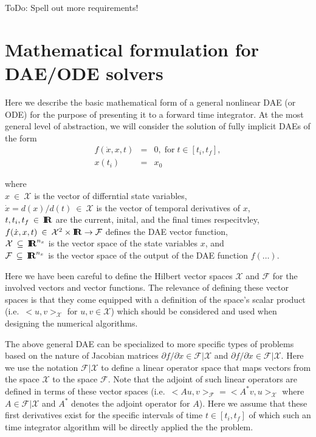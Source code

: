 \documentclass[pdf,ps2pdf,11pt]{SANDreport}
\begin{document}
ToDo: Spell out more requirements!

\section{Mathematical formulation for DAE/ODE solvers}

Here we describe the basic mathematical form of a general nonlinear DAE (or
ODE) for the purpose of presenting it to a forward time integrator.  At the
most general level of abstraction, we will consider the solution of fully
implicit DAEs of the form
%
\begin{eqnarray}
f(\dot{x},x,t) & = & 0, \; \mbox{for} \; t \in [t_i, t_f], \label{rythmos:eqn:dae} \\
x(t_i) & = & x_0 \label{rythmos:eqn:dae:ic}
\end{eqnarray}
\begin{tabbing}
\hspace{4ex}where\hspace{5ex}\= \\
\>	$x\:\in\:\mathcal{X}$ is the vector of differntial state variables, \\
\>	$\dot{x} = d(x)/d(t)\:\in\:\mathcal{X}$ is the vector of temporal derivatives of $x$, \\
\>	$t, t_i, t_f\:\in\:\mbox{\textbf{I}}\hspace{-0.6ex}\mbox{\textbf{R}}$ are the current, inital, and the final times respecitvley, \\
\>	$f(\dot{x},x,t)\:\in\:\mathcal{X}^2\times\mbox{\textbf{I}}\hspace{-0.6ex}\mbox{\textbf{R}}\rightarrow\mathcal{F}$ defines the DAE vector function, \\
\>	$\mathcal{X} \:\subseteq\:\mbox{\textbf{I}}\hspace{-0.6ex}\mbox{\textbf{R}}^{n_x}$ is the vector space of the state variables $x$, and \\
\>	$\mathcal{F} \:\subseteq\:\mbox{\textbf{I}}\hspace{-0.6ex}\mbox{\textbf{R}}^{n_x}$ is the vector space of the output of the DAE function $f(\ldots)$.
\end{tabbing}

Here we have been careful to define the Hilbert vector spaces $\mathcal{X}$
and $\mathcal{F}$ for the involved vectors and vector functions.  The
relevance of defining these vector spaces is that they come equipped with a
definition of the space's scalar product (i.e.\ $<u,v>_{\mathcal{X}}$ for
$u,v\in\mathcal{X}$) which should be considered and used when designing the
numerical algorithms.

The above general DAE can be specialized to more specific types of problems
based on the nature of Jacobian matrices ${}\partial f / {}\partial
{}\dot{x}\in\mathcal{F}|\mathcal{X}$ and ${}\partial f / {}\partial
{}\dot{x}\in\mathcal{F}|\mathcal{X}$.  Here we use the notation
$\mathcal{F}|\mathcal{X}$ to define a linear operator space that maps vectors
from the space $\mathcal{X}$ to the space $\mathcal{F}$.  Note that the
adjoint of such linear operators are defined in terms of these vector spaces
(i.e.\ $<A u,v>_{\mathcal{F}} = <A^* v,u>_{\mathcal{X}}$ where
$A\in\mathcal{F}|\mathcal{X}$ and $A^*$ denotes the adjoint operator for $A$).
Here we assume that these first derivatives exist for the specific intervals
of time $t\in[t_i,t_f]$ of which such an time integrator algorithm will be
directly applied the the problem.
\end{document}
